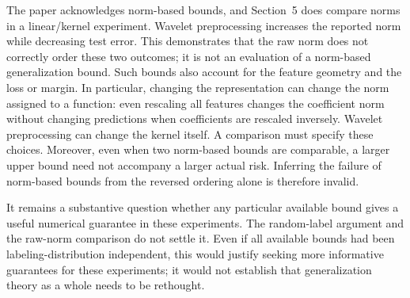 \documentclass[11pt,twoside]{article}
\theoremstyle{definition}
\theoremstyle{remark}
\begin{document}
The paper acknowledges norm-based bounds, and Section~5 does compare norms
in a linear/kernel experiment. Wavelet preprocessing increases the reported
norm while decreasing test error. This demonstrates that the raw norm does
not correctly order these two outcomes; it is not an evaluation of a
norm-based generalization bound. Such bounds also account for the feature
geometry and the loss or margin. In particular, changing the representation
can change the norm assigned to a function: even rescaling all features
changes the coefficient norm without changing predictions when coefficients
are rescaled inversely. Wavelet preprocessing can change the kernel itself.
A comparison must specify these choices. Moreover, even when two norm-based
bounds are comparable, a larger upper bound need not accompany a larger
actual risk. Inferring the failure of norm-based bounds from the reversed
ordering alone is therefore invalid.%
\label{en:kernel-margin-bound}

It remains a substantive question whether any particular available bound
gives a useful numerical guarantee in these experiments. The random-label
argument and the raw-norm comparison do not settle it. Even if all available
bounds had been labeling-distribution independent, this would justify
seeking more informative guarantees for these experiments; it would not
establish that generalization theory as a whole needs to be rethought.
\end{document}
